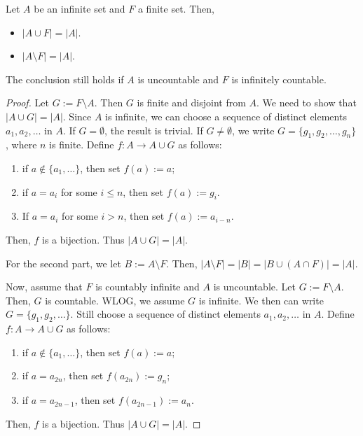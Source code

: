 

\begin{proposition}
  Let $A$ be an infinite set and $F$ a finite set. Then,
  \begin{itemize}
    \item $|A\cup F|=|A|$.
    \item $|A\setminus F|=|A|$.
  \end{itemize}
  The conclusion still holds if $A$ is uncountable and $F$ is infinitely countable.
\end{proposition}
\begin{proof}
  Let $G:=F\setminus A$. Then $G$ is finite and disjoint from $A$. We need to show that $|A\cup G|=|A|$. Since $A$ is infinite, we can choose a sequence of distinct elements \(a_1,a_2,\ldots\) in \(A\).  If $G=\emptyset$, the result is trivial. If $G\neq\emptyset$, we write $G=\{g_1,g_2,\ldots,g_n\}$, where $n$ is finite. Define $f:A\to A\cup G$ as follows:
  \begin{enumerate}
    \item if $a\notin\{a_1,\ldots\}$, then set $f(a):=a$;
    \item if $a=a_i$ for some $i\leq n$, then set $f(a):=g_i$.
    \item If $a=a_i$ for some $i>n$, then set $f(a):=a_{i-n}$.
  \end{enumerate}
  Then, $f$ is a bijection. Thus $|A\cup G|=|A|$.

  For the second part, we let $B:=A\setminus F$. Then, $|A\setminus F|=|B|=|B\cup (A\cap F)|=|A|$.

  Now, assume that $F$ is countably infinite and $A$ is uncountable. Let $G:=F\setminus A$. Then, $G$ is countable. WLOG, we assume $G$ is infinite. We then can write $G=\{g_1,g_2,\ldots\}$. Still choose a sequence of distinct elements \(a_1,a_2,\ldots\) in \(A\). Define $f:A\to A\cup G$ as follows:
  \begin{enumerate}
    \item if $a\notin\{a_1,\ldots\}$, then set $f(a):=a$;
    \item if $a=a_{2n}$, then set $f(a_{2n}):=g_n$;
    \item if $a=a_{2n-1}$, then set $f(a_{2n-1}):=a_{n}$.
  \end{enumerate}
  Then, $f$ is a bijection. Thus $|A\cup G|=|A|$.

\end{proof}

